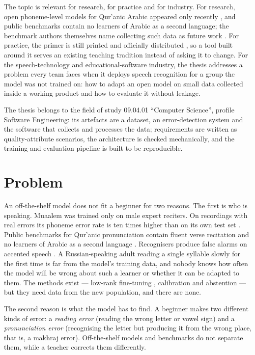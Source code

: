 The topic is relevant for research, for practice and for industry. For research, open phoneme-level models
for Qur'anic Arabic appeared only recently \cite{SRC-002}, and public benchmarks contain no learners of Arabic as
a second language; the benchmark authors themselves name collecting such data as future work
\cite{SRC-004,SRC-031}. For practice, the primer is still printed and officially distributed
\cite{SRC-040,SRC-020}, so a tool built around it serves an existing teaching tradition instead of asking it to
change. For the speech-technology and educational-software industry, the thesis addresses a problem every team
faces when it deploys speech recognition for a group the model was not trained on: how to adapt an open model on
small data collected inside a working product and how to evaluate it without leakage.

The thesis belongs to the field of study 09.04.01 ``Computer Science'', profile Software Engineering: its
artefacts are a dataset, an error-detection system and the software that collects and processes the data; requirements are written
as quality-attribute scenarios, the architecture is checked mechanically, and the training and evaluation
pipeline is built to be reproducible.

\section{Problem}

An off-the-shelf model does not fit a beginner for two reasons. The first is who is speaking. Muaalem was
trained only on male expert reciters. On recordings with real errors its phoneme error rate is ten times higher
than on its own test set \cite{SRC-002}. Public benchmarks for Qur'anic pronunciation contain fluent verse
recitation and no learners of Arabic as a second language \cite{SRC-004,SRC-031,SRC-043}. Recognisers produce
false alarms on accented speech \cite{SRC-026}. A Russian-speaking adult reading a single syllable slowly for
the first time is far from the model's training data, and nobody knows how often the model will be wrong about
such a learner or whether it can be adapted to them. The methods exist --- low-rank fine-tuning
\cite{SRC-111}, calibration and abstention \cite{SRC-112,SRC-117} --- but they need data from the new
population, and there are none.

The second reason is what the model has to find. A beginner makes two different kinds of error: a \emph{reading
error} (reading the wrong letter or vowel sign) and a \emph{pronunciation error} (recognising the letter but
producing it from the wrong place, that is, a makhraj error). Off-the-shelf models and benchmarks do not separate
them, while a teacher corrects them differently.

